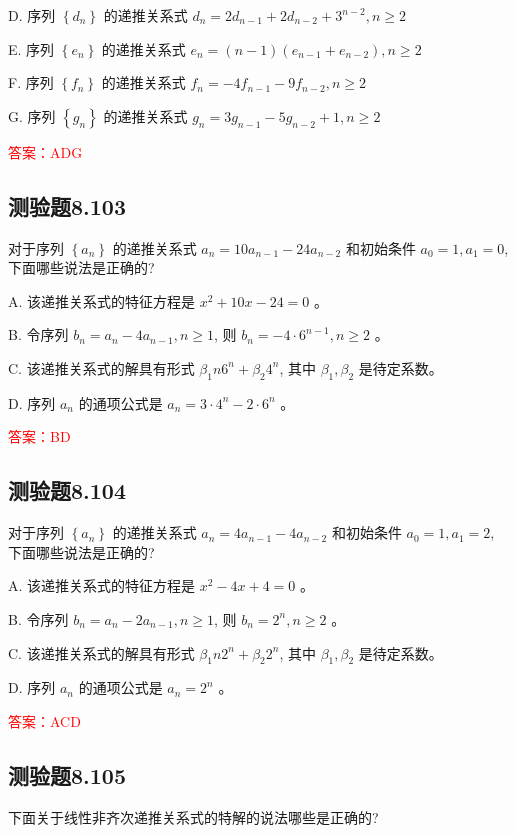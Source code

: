 \documentclass[UTF8, heading=true]{ctexart}
\begin{document}
D. 
序列 $\left\{d_n\right\}$ 的递推关系式 $d_n=2 d_{n-1}+2 d_{n-2}+3^{n-2}, n \geq 2$

E. 
序列 $\left\{e_n\right\}$ 的递推关系式 $e_n=(n-1)\left(e_{n-1}+e_{n-2}\right), n \geq 2$

F.
序列 $\left\{f_n\right\}$ 的递推关系式 $f_n=-4 f_{n-1}-9 f_{n-2}, n \geq 2$

G.
序列 $\left\{g_n\right\}$ 的递推关系式 $g_n=3 g_{n-1}-5 g_{n-2}+1, n \geq 2$

\textcolor{red}{答案：ADG}

\subsection{测验题8.103}

对于序列 $\left\{a_n\right\}$ 的递推关系式 $a_n=10 a_{n-1}-24 a_{n-2}$ 和初始条件 $a_0=1, a_1=0$, 下面哪些说法是正确的?

A. 
该递推关系式的特征方程是 $x^2+10 x-24=0$ 。

B. 
令序列 $b_n=a_n-4 a_{n-1}, n \geq 1$, 则 $b_n=-4 \cdot 6^{n-1}, n \geq 2$ 。

C. 
该递推关系式的解具有形式 $\beta_1 n 6^n+\beta_2 4^n$, 其中 $\beta_1, \beta_2$ 是待定系数。

D. 
序列 $a_n$ 的通项公式是 $a_n=3 \cdot 4^n-2 \cdot 6^n$ 。

\textcolor{red}{答案：BD}

\subsection{测验题8.104}

对于序列 $\left\{a_n\right\}$ 的递推关系式 $a_n=4 a_{n-1}-4 a_{n-2}$ 和初始条件 $a_0=1, a_1=2$, 下面哪些说法是正确的?

A. 该递推关系式的特征方程是 $x^2-4 x+4=0$ 。

B. 令序列 $b_n=a_n-2 a_{n-1}, n \geq 1$, 则 $b_n=2^n, n \geq 2$ 。

C. 该递推关系式的解具有形式 $\beta_1 n 2^n+\beta_2 2^n$, 其中 $\beta_1, \beta_2$ 是待定系数。

D. 序列 $a_n$ 的通项公式是 $a_n=2^n$ 。

\textcolor{red}{答案：ACD}

\subsection{测验题8.105}

下面关于线性非齐次递推关系式的特解的说法哪些是正确的?
\end{document}
